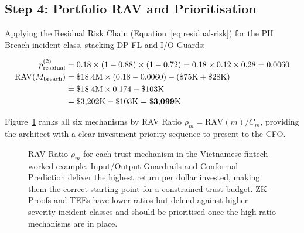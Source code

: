 \subsection{Step 4: Portfolio RAV and Prioritisation}
\label{subsec:step4-portfolio}

Applying the Residual Risk Chain
(Equation~\eqref{eq:residual-risk}) for the PII Breach incident
class, stacking DP-FL and I/O Guards:

\begin{align}
  p_{\mathrm{residual}}^{(2)}
    &= 0.18 \times (1 - 0.88) \times (1 - 0.72)
    = 0.18 \times 0.12 \times 0.28
    = 0.0060 \notag\\
  \mathrm{RAV}(M_{\mathrm{breach}})
    &= \$18.4\text{M} \times (0.18 - 0.0060)
      - (\$75\text{K} + \$28\text{K}) \notag\\
    &= \$18.4\text{M} \times 0.174 - \$103\text{K} \notag\\
    &= \$3{,}202\text{K} - \$103\text{K}
    = \mathbf{\$3{,}099\text{K}} \notag
\end{align}

Figure~\ref{fig:rav-prioritisation} ranks all six mechanisms
by RAV Ratio $\rho_m = \mathrm{RAV}(m) / C_m$, providing
the architect with a clear investment priority sequence to
present to the CFO.

\begin{figure}[ht]
\centering
{}
\caption{RAV Ratio $\rho_m$ for each trust mechanism in the
  Vietnamese fintech worked example.
  Input/Output Guardrails and Conformal Prediction deliver the
  highest return per dollar invested, making them the correct
  starting point for a constrained trust budget.
  ZK-Proofs and TEEs have lower ratios but defend against
  higher-severity incident classes and should be prioritised
  once the high-ratio mechanisms are in place.}
\label{fig:rav-prioritisation}
\end{figure}

